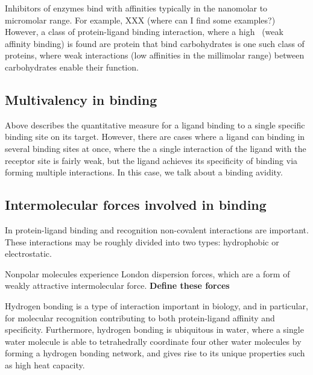 Inhibitors of enzymes bind with affinities typically in the nanomolar to micromolar range.  For example, XXX (where can I find some examples?) However, a class of protein-ligand binding interaction, where a high \KD\ (weak affinity binding) is found are protein that bind carbohydrates is one such class of proteins, where weak interactions (low affinities in the millimolar range) between carbohydrates enable their function.

\subsection{Multivalency in binding}
Above describes the quantitative measure for a ligand binding to a single specific binding site on its target.  However, there are cases where a ligand can binding in several binding sites at once, where the a single interaction of the ligand with the receptor site is fairly weak, but the ligand achieves its specificity of binding via forming multiple interactions.  In this case, we talk about a binding avidity.

\subsection{Intermolecular forces involved in binding}



In protein-ligand binding and recognition non-covalent interactions are important.  These interactions may be roughly divided into two types: hydrophobic or electrostatic.   

Nonpolar molecules experience London dispersion forces, which are a form of weakly attractive intermolecular force. \textbf{Define these forces}

Hydrogen bonding is a type of interaction important in biology, and in particular, for molecular recognition contributing to both protein-ligand affinity and specificity. Furthermore, hydrogen bonding is ubiquitous in water, where a single water molecule is able to tetrahedrally coordinate four other water molecules by forming a hydrogen bonding network, and gives rise to its unique properties such as high heat capacity.


